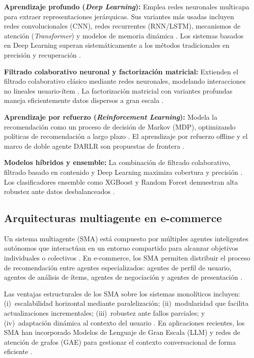 \documentclass[12pt, a4paper]{article}
\begin{document}
\textbf{Aprendizaje profundo (\textit{Deep Learning}):} Emplea redes neuronales
multicapa para extraer representaciones jer\'arquicas. Sus variantes m\'as
usadas incluyen redes convolucionales (CNN), redes recurrentes (RNN/LSTM),
mecanismos de atenci\'on (\textit{Transformer}) y modelos de memoria din\'amica
\cite{Gupta2024, Ding2025}. Los sistemas basados en Deep Learning superan
sistem\'aticamente a los m\'etodos tradicionales en precisi\'on y recuperaci\'on
\cite{Alam2025, Lampa2024}.

\textbf{Filtrado colaborativo neuronal y factorizaci\'on matricial:} Extienden
el filtrado colaborativo cl\'asico mediante redes neuronales, modelando
interacciones no lineales usuario-\'item \cite{LiYuetong2025, Girish2025}.
La factorizaci\'on matricial con variantes profundas maneja eficientemente
datos dispersos a gran escala \cite{Lin2025}.

\textbf{Aprendizaje por refuerzo (\textit{Reinforcement Learning}):} Modela
la recomendaci\'on como un proceso de decisi\'on de Markov (MDP), optimizando
pol\'iticas de recomendaci\'on a largo plazo \cite{Zhang2025DARLR,
Zhang2023RL}. El aprendizaje por refuerzo offline y el marco de doble agente
DARLR son propuestas de frontera \cite{Zhang2025DARLR}.

\textbf{Modelos h\'ibridos y ensemble:} La combinaci\'on de filtrado
colaborativo, filtrado basado en contenido y Deep Learning maximiza cobertura
y precisi\'on \cite{Gupta2024, Lu2025, Girish2025}. Los clasificadores ensemble
como XGBoost y Random Forest demuestran alta robustez ante datos desbalanceados
\cite{Dinata2025}.

\subsection{Arquitecturas multiagente en e-commerce}

Un sistema multiagente (SMA) est\'a compuesto por m\'ultiples agentes
inteligentes aut\'onomos que interact\'uan en un entorno compartido para
alcanzar objetivos individuales o colectivos \cite{Alhejaili2021}. En
e-commerce, los SMA permiten distribuir el proceso de recomendaci\'on entre
agentes especializados: agentes de perfil de usuario, agentes de an\'alisis de
\'items, agentes de negociaci\'on y agentes de presentaci\'on \cite{Alhejaili2021,
Bai2025}.

Las ventajas estructurales de los SMA sobre los sistemas monol\'iticos incluyen:
(i)~escalabilidad horizontal mediante paralelizaci\'on; (ii)~modularidad que
facilita actualizaciones incrementales; (iii)~robustez ante fallos parciales;
y (iv)~adaptaci\'on din\'amica al contexto del usuario \cite{Ho2025GraphMind,
Bai2025}. En aplicaciones recientes, los SMA han incorporado Modelos de
Lenguaje de Gran Escala (LLM) y redes de atenci\'on de grafos (GAE) para
gestionar el contexto conversacional de forma eficiente \cite{Ho2025GraphMind}.
\end{document}
